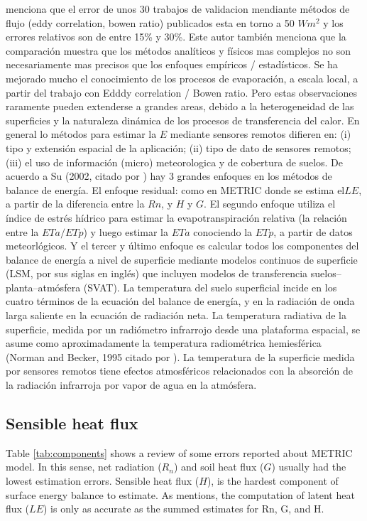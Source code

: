 \documentclass[]{article}
\begin{document}
\cite{Kalma2008} menciona que el error de unos 30 trabajos de validacion mendiante métodos de flujo (eddy correlation, bowen ratio) publicados esta en torno a 50 $W m^2$ y los errores relativos son de entre 15\% y 30\%. Este autor también menciona que la comparación muestra que los métodos analíticos y físicos mas complejos no son necesariamente mas precisos que los enfoques empíricos / estadísticos. 
Se ha mejorado mucho el conocimiento de los procesos de evaporación, a escala local, a partir del trabajo con Edddy correlation / Bowen ratio. Pero estas observaciones raramente pueden extenderse a grandes areas, debido a la heterogeneidad de las superficies y la naturaleza dinámica de los procesos de transferencia del calor. 
En general lo métodos para estimar la $E$ mediante sensores remotos difieren en: (i) tipo y extensión espacial de la aplicación; (ii) tipo de dato de sensores remotos; (iii) el uso de información (micro) meteorologica y de cobertura de suelos.
De acuerdo a Su (2002, citado por \cite{Kalma2008}) hay 3 grandes enfoques en los métodos de balance de energía. El enfoque residual: como en METRIC donde se estima el$LE$, a partir de la diferencia entre la $Rn$, y $H$ y $G$. El segundo enfoque utiliza el índice de estrés hídrico para estimar la evapotranspiración relativa (la relación entre la $ETa/ETp$) y luego estimar la $ETa$ conociendo la $ETp$, a partir de datos meteorlógicos. Y el tercer y último enfoque es calcular todos los componentes del balance de energía a nivel de superficie mediante modelos continuos de superficie (LSM, por sus siglas en inglés) que incluyen modelos de transferencia suelos--planta--atmósfera (SVAT). 
La temperatura del suelo superficial incide en los cuatro términos de la ecuación del balance de energía, y en la radiación de onda larga saliente en la ecuación de radiación neta.
La temperatura radiativa de la superficie, medida por un radiómetro infrarrojo desde una plataforma espacial, se asume como aproximadamente la temperatura radiométrica hemiesférica (Norman and Becker, 1995 citado por \cite{Kalma2008}).
La temperatura de la superficie medida por sensores remotos tiene efectos atmosféricos relacionados con la absorción de la radiación infrarroja por vapor de agua en la atmósfera.

\subsection{Sensible heat flux}

Table \ref{tab:components} shows a review of some errors reported about METRIC model. In this sense, net radiation ($R_n$) and soil heat flux ($G$) usually had the lowest estimation errors. Sensible heat flux ($H$), is the hardest component of surface energy balance to estimate. As \cite{Allen2007a} mentions, the computation of latent heat flux ($LE$) is only as accurate as the summed estimates for Rn, G, and H. 
\end{document}

